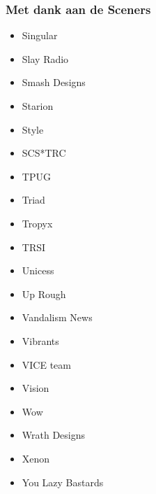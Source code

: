 \begin{frame}
\frametitle{Met dank aan de Sceners}

\begin{multicols}{3}
\begin{itemize}
\item Singular
\item Slay Radio
\item Smash Designs
\item Starion
\item Style
\item SCS*TRC
\item TPUG
\item Triad
\item Tropyx
\item TRSI
\item Unicess
\item Up Rough
\item Vandalism News
\item Vibrants
\item VICE team
\item Vision
\item Wow
\item Wrath Designs
\item Xenon
\item You Lazy Bastards
\end{itemize}
\end{multicols}

\end{frame}
